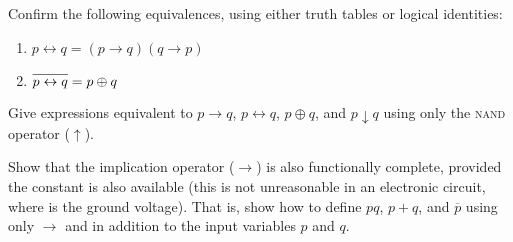 \begin{exercises}
\item Confirm the following equivalences, using either truth tables or logical identities:
\begin{enumerate}
\item $p\leftrightarrow q = (p\rightarrow q)(q\rightarrow p)$
\item $\overline{p\leftrightarrow q\vphantom{X}} = p\oplus q$
\end{enumerate}

\item Give expressions equivalent to $p\rightarrow q$, $p\leftrightarrow q$, $p\oplus q$, and $p\downarrow q$ using only the \textsc{nand} operator ($\uparrow$).

\item Show that the implication operator ($\rightarrow$) is also functionally complete, provided the constant \0 is also available (this is not unreasonable in an electronic circuit, where \0 is the ground voltage). That is, show how to define $pq$, $p+q$, and $\overline{p}$ using only $\rightarrow$ and \0 in addition to the input variables $p$ and $q$.
\end{exercises}

